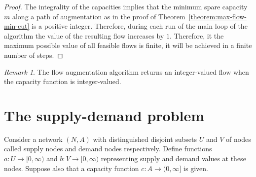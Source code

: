\documentclass{amsbook}
\theoremstyle{definition}
\theoremstyle{remark}
\newtheorem{remark}[theorem]{Remark}
\begin{document}
\begin{proof}
  The integrality of the capacities implies that the minimum spare capacity $m$ along a path of augmentation as in the proof of Theorem~\ref{theorem:max-flow-min-cut} is a positive integer.
  Therefore, during each run of the main loop of the algorithm the value of the resulting flow increases by $1$.
  Therefore, it the maximum possible value of all feasible flows is finite, it will be achieved in a finite number of steps.
\end{proof}
\begin{remark}
  The flow augmentation algorithm returns an integer-valued flow when the capacity function is integer-valued.
\end{remark}

\section{The supply-demand problem}
\label{sec:supply-demand-probl}

Consider a network $(N,A)$ with distinguished disjoint subsets $U$ and $V$ of nodes called supply nodes and demand nodes respectively.
Define functions $a:U\to [0,\infty)$ and $b:V\to [0,\infty)$ representing supply and demand values at these nodes.
Suppose also that a capacity function $c:A\to (0,\infty]$ is given.
\end{document}
